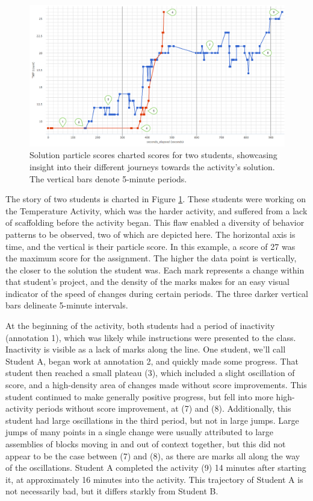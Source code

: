 \begin{figure}
  \centering
      \includegraphics[width=\textwidth]{images/particles-graph-annotated}
  \caption[Solution Particle Scores Charted for Two Students]{Solution particle scores charted scores for two students, showcasing insight into their different journeys towards the activity's solution. The vertical bars denote 5-minute periods.}
  \label{fig:paricles-temperature-two}
\end{figure}

The story of two students is charted in Figure \ref{fig:paricles-temperature-two}. These students were working on the Temperature Activity, which was the harder activity, and suffered from a lack of scaffolding before the activity began. This flaw enabled a diversity of behavior patterns to be observed, two of which are depicted here. The horizontal axis is time, and the vertical is their particle score. In this example, a score of 27 was the maximum score for the assignment. The higher the data point is vertically, the closer to the solution the student was. Each mark represents a change within that student's project, and the density of the marks makes for an easy visual indicator of the speed of changes during certain periods. The three darker vertical bars delineate 5-minute intervals.

At the beginning of the activity, both students had a period of inactivity (annotation 1), which was likely while instructions were presented to the class. Inactivity is visible as a lack of marks along the line. One student, we'll call Student A, began work at annotation 2, and quickly made some progress. That student then reached a small plateau (3), which included a slight oscillation of score, and a high-density area of changes made without score improvements. This student continued to make generally positive progress, but fell into more high-activity periods without score improvement, at (7) and (8). Additionally, this student had large oscillations in the third period, but not in large jumps. Large jumps of many points in a single change were usually attributed to large assemblies of blocks moving in and out of context together, but this did not appear to be the case between (7) and (8), as there are marks all along the way of the oscillations. Student A completed the activity (9) 14 minutes after starting it, at approximately 16 minutes into the activity. This trajectory of Student A is not necessarily bad, but it differs starkly from Student B.

